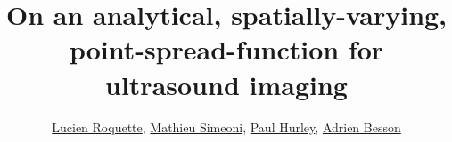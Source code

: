 

\title[EPFLIBM]{On an analytical, spatially-varying, point-spread-function for ultrasound imaging}

\author[short-author]{ %
	\href{mailto:lucien.roquette@epfl.ch}{Lucien Roquette\inst{\dagger}},
	\href{mailto:mathieu.simeoni@epfl.ch}{Mathieu Simeoni\inst{\dagger}},
	\href{mailto:mathieu.simeoni@epfl.ch}{Paul Hurley\inst{\dagger}},
	\href{mailto:adrien.besson@epfl.ch}{Adrien Besson\inst{\star}}	
}

